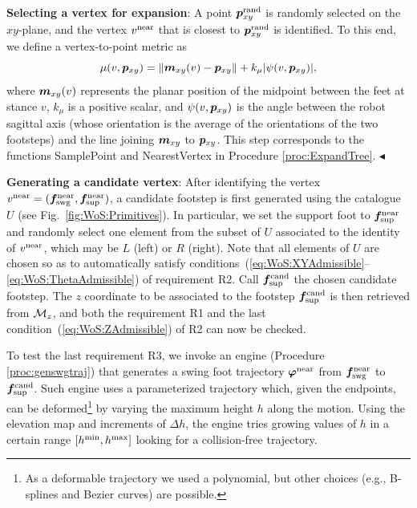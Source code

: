 {\bf Selecting a vertex for expansion}: A point ${\bm{p}}_{xy}^{\rm rand}$ is randomly selected on the $xy$-plane, and
the vertex $v^{\rm near}$ that is closest to ${\bm{p}}_{xy}^{\rm rand}$ is identified. To this end, we define a vertex-to-point metric as
\begin{equation*}
\mu(v, {\bm{p}}_{xy}) = \lVert {\bm{m}}_{xy}(v) - {\bm{p}}_{xy} \rVert + k_{\mu} |\psi(v,{\bm{p}}_{xy})|,
\end{equation*}
where ${\bm{m}}_{xy}(v)$ represents the planar position of the midpoint between the feet at stance $v$, $k_{\mu}$ is a positive scalar, and $\psi(v,{\bm{p}}_{xy})$ is the angle between the robot sagittal axis (whose orientation is the average of the orientations of the two footsteps) and the line joining ${\bm{m}}_{xy}$ to ${\bm{p}}_{xy}$. 
This step corresponds to the functions SamplePoint and NearestVertex in Procedure \ref{proc:ExpandTree}.
\hfill $\blacktriangleleft$

{\bf Generating a candidate vertex}:  
After identifying the vertex $v^{\rm near}=({\bm{f}}_{\rm swg}^{\rm near},{\bm{f}}_{\rm sup}^{\rm near})$, a candidate footstep is first generated using the catalogue $U$ (see Fig.~\ref{fig:WoS:Primitives}). In particular, we set the support foot to ${\bm{f}}_{\rm sup}^{\rm near}$ and randomly select one element from the subset of $U$ associated to the identity of $v^{\rm near}$, which may be $L$ (left) or $R$ (right). Note that all elements of $U$ are chosen so as to automatically satisfy conditions~(\ref{eq:WoS:XYAdmissible}--\ref{eq:WoS:ThetaAdmissible}) of requirement R2.
Call ${\bm{f}}_{\rm sup}^{\rm cand}$ the chosen candidate footstep. The $z$ coordinate to be associated to the footstep ${\bm{f}}_{\rm sup}^{\rm cand}$ is then retrieved from ${\cal M}_{z}$, and both the requirement R1 and the last condition~(\ref{eq:WoS:ZAdmissible}) of R2 can now be checked.

To test the last requirement R3, we invoke an engine (Procedure \ref{proc:genswgtraj}) that generates a swing foot trajectory ${\bm{\varphi}}^{\rm near}$ from ${\bm{f}}_{\rm swg}^{\rm near}$ to ${\bm{f}}_{\rm sup}^{\rm cand}$. Such engine uses a parameterized trajectory which, given the endpoints, can be deformed\footnote{As a deformable trajectory we used a polynomial, but other choices (e.g., B-splines and Bezier curves) are possible.} by varying the maximum height $h$ along the motion. 
Using the elevation map and increments of $\Delta h$, the engine tries growing values of $h$ in a certain range $[h^{\rm min}, h^{\rm max}]$ looking for a collision-free trajectory.

